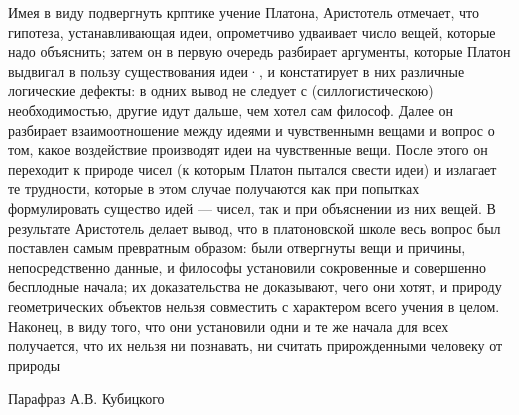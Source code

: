 \documentclass[oneside, 17pt, dvipsnames]{extbook}
\begin{document}
\epigraph{
Имея в виду подвергнуть крптике учение Платона, Аристотель отмечает, что гипотеза, устанавливающая идеи, опрометчиво удваивает число вещей, которые надо объяснить; затем он в первую очередь разбирает аргументы, которые Платон выдвигал в пользу существования идеи·, и констатирует в них различные логические дефекты: в одних вывод не следует с (силлогистическою) необходимостью, другие идут дальше, чем хотел сам философ. Далее он разбирает взаимоотношение между идеями и чувственнымн вещами и вопрос о том, какое воздействие производят идеи на чувственные вещи. После этого он переходит к природе чисел (к которым Платон пытался свести идеи) и излагает те трудности, которые в этом случае получаются как при попытках формулировать существо идей --- чисел, так и при объяснении из них вещей. В результате Аристотель делает вывод, что в платоновской школе весь вопрос был поставлен самым превратным образом: были отвергнуты вещи и причины, непосредственно данные, и философы установили сокровенные и совершенно бесплодные начала; их доказательства не доказывают, чего они хотят, и природу геометрических объектов нельзя совместить с характером всего учения в целом. Наконец, в виду того, что они установили одни и те же начала для всех получается, что их нельзя ни познавать, ни считать прирожденными человеку от природы
}{Парафраз А.В. Кубицкого}
\end{document}
